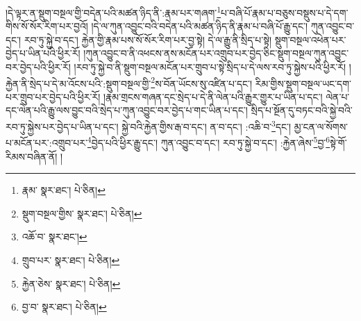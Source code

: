 །དེ་ལྟར་ན་སྡུག་བསྔལ་གྱི་བདེན་པའི་མཚན་ཉིད་ནི་:རྣམ་པར་གཞག་\footnote{རྣམ་  སྣར་ཐང་།  པེ་ཅིན། }པ་བཞི་པོ་རྣམ་པ་བཅུས་བསྡུས་པ་དེ་དག་གིས་སོ་སོར་རིག་པར་བྱའོ། །དེ་ལ་ཀུན་འབྱུང་བའི་བདེན་པའི་མཚན་ཉིད་ནི་རྣམ་པ་བཞི་པོ་རྒྱུ་དང་། ཀུན་འབྱུང་བ་དང་། རབ་ཏུ་སྐྱེ་བ་དང་། རྐྱེན་གྱི་རྣམ་པས་སོ་སོར་རིག་པར་བྱ་སྟེ། དེ་ལ་རྒྱུ་ནི་སྲིད་པ་སྟེ། སྡུག་བསྔལ་འཕེན་པར་བྱེད་པ་ཡིན་པའི་ཕྱིར་རོ། །ཀུན་འབྱུང་བ་ནི་འཕངས་ནས་མངོན་པར་འགྲུབ་པར་བྱེད་ཅིང་སྡུག་བསྔལ་ཀུན་འབྱུང་བར་བྱེད་པའི་ཕྱིར་རོ། །རབ་ཏུ་སྐྱེ་བ་ནི་སྡུག་བསྔལ་མངོན་པར་གྲུབ་པ་སྟེ་སྲིད་པ་དེ་ལས་རབ་ཏུ་སྐྱེས་པའི་ཕྱིར་རོ། །རྐྱེན་ནི་སྲེད་པ་དེ་མ་འོངས་པའི་:སྡུག་བསྔལ་གྱི་\footnote{སྡུག་བསྔལ་གྱིས་  སྣར་ཐང་།  པེ་ཅིན། }ས་བོན་ཡོངས་སུ་འཛིན་པ་དང་། རིམ་གྱིས་སྡུག་བསྔལ་ཡང་དག་པར་གྲུབ་པར་བྱེད་པའི་ཕྱིར་རོ། །རྣམ་གྲངས་གཞན་དང་སྲེད་པ་དེ་ནི་ལེན་པའི་རྒྱུར་གྱུར་པ་ཡིན་པ་དང་། ལེན་པ་དང་ལེན་པའི་རྒྱུ་ལས་བྱུང་བའི་སྲེད་པ་ཀུན་འབྱུང་བར་བྱེད་པ་གང་ཡིན་པ་དང་། སྲིད་པ་སྔོན་དུ་བཏང་བའི་སྐྱེ་བའི་རབ་ཏུ་སྐྱེས་པར་བྱེད་པ་ཡིན་པ་དང་། སྐྱེ་བའི་རྐྱེན་གྱིས་རྒ་བ་དང་། ན་བ་དང་། :འཆི་བ་\footnote{འཆོ་བ་  སྣར་ཐང་། }དང་། མྱ་ངན་ལ་སོགས་པ་མངོན་པར་:འགྲུབ་པར་\footnote{གྲུབ་པར་  སྣར་ཐང་།  པེ་ཅིན། }བྱེད་པའི་ཕྱིར་རྒྱུ་དང་། ཀུན་འབྱུང་བ་དང་། རབ་ཏུ་སྐྱེ་བ་དང་། :རྐྱེན་ཞེས་\footnote{རྐྱེན་ཅེས་  སྣར་ཐང་།  པེ་ཅིན། }བྱ་\footnote{བྱ་བ་  སྣར་ཐང་།  པེ་ཅིན། }སྟེ་གོ་རིམས་བཞིན་ནོ། །
